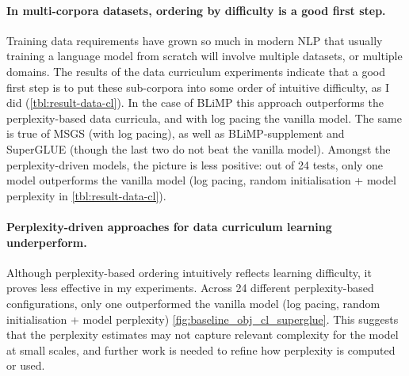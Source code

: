 \paragraph{In multi-corpora datasets, ordering by difficulty is a good first step.}
Training data requirements have grown so much in modern NLP that usually training a language model from scratch will involve multiple datasets, or multiple domains. The results of the data curriculum experiments indicate that a good first step is to put these sub-corpora into some order of intuitive difficulty, as I did (\cref{tbl:result-data-cl}). In the case of BLiMP this approach outperforms the perplexity-based data curricula, and with log pacing the vanilla model. The same is true of MSGS (with log pacing), as well as BLiMP-supplement and SuperGLUE (though the last two do not beat the vanilla model). 
Amongst the perplexity-driven models, the picture is less positive: out of 24 tests, only one model outperforms the vanilla model (log pacing, random initialisation + model perplexity in \cref{tbl:result-data-cl}).

\paragraph{Perplexity-driven approaches for data curriculum learning underperform.}
Although perplexity-based ordering intuitively reflects learning difficulty, it proves less effective in my experiments. Across 24 different perplexity-based configurations, only one outperformed the vanilla model (log pacing, random initialisation + model perplexity) \cref{fig:baseline_obj_cl_superglue}. This suggests that the perplexity estimates may not capture relevant complexity for the model at small scales, and further work is needed to refine how perplexity is computed or used.



